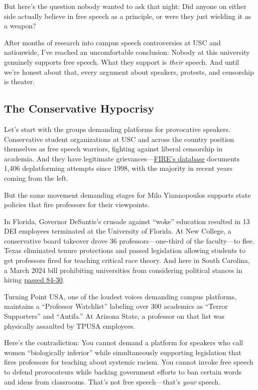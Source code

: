 \documentclass[11pt]{article}
\begin{document}
But here's the question nobody wanted to ask that night: Did anyone on either side actually believe in free speech as a principle, or were they just wielding it as a weapon?

After months of research into campus speech controversies at USC and nationwide, I've reached an uncomfortable conclusion: Nobody at this university genuinely supports free speech. What they support is \textit{their} speech. And until we're honest about that, every argument about speakers, protests, and censorship is theater.

\subsection{The Conservative Hypocrisy}

Let's start with the groups demanding platforms for provocative speakers. Conservative student organizations at USC and across the country position themselves as free speech warriors, fighting against liberal censorship in academia. And they have legitimate grievances---\href{https://www.thefire.org/research-learn/campus-deplatforming-database}{FIRE's database} documents 1,406 deplatforming attempts since 1998, with the majority in recent years coming from the left.

But the same movement demanding stages for Milo Yiannopoulos supports state policies that fire professors for their viewpoints.

In Florida, Governor DeSantis's crusade against ``woke'' education resulted in 13 DEI employees terminated at the University of Florida. At New College, a conservative board takeover drove 36 professors---one-third of the faculty---to flee. Texas eliminated tenure protections and passed legislation allowing students to get professors fired for teaching critical race theory. And here in South Carolina, a March 2024 bill prohibiting universities from considering political stances in hiring \href{https://www.scstatehouse.gov/}{passed 84-30}.

Turning Point USA, one of the loudest voices demanding campus platforms, maintains a ``Professor Watchlist'' labeling over 300 academics as ``Terror Supporters'' and ``Antifa.'' At Arizona State, a professor on that list was physically assaulted by TPUSA employees.

Here's the contradiction: You cannot demand a platform for speakers who call women ``biologically inferior'' while simultaneously supporting legislation that fires professors for teaching about systemic racism. You cannot invoke free speech to defend provocateurs while backing government efforts to ban certain words and ideas from classrooms. That's not free speech---that's \textit{your} speech.
\end{document}
